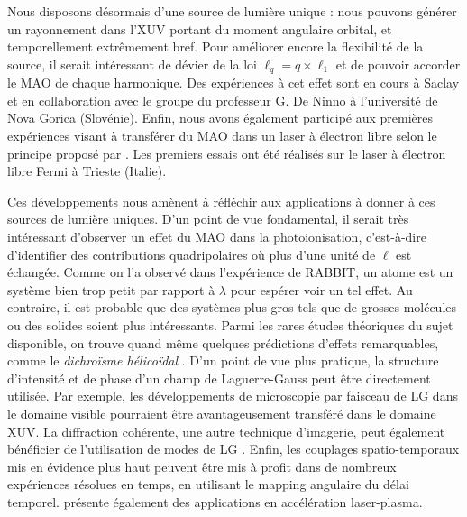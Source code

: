 Nous disposons désormais d'une source de lumière unique : nous pouvons générer un rayonnement dans l'XUV portant du moment angulaire orbital, et temporellement extrêmement bref. Pour améliorer encore la flexibilité de la source, il serait intéressant de dévier de la loi $\ell_q=q\times\ell_1$ et de pouvoir accorder le MAO de chaque harmonique. Des expériences à cet effet sont en cours à Saclay et en collaboration avec le groupe du professeur G. De Ninno à l'université de Nova Gorica (Slovénie). Enfin, nous avons également participé aux premières expériences visant à transférer du MAO dans un laser à électron libre selon le principe proposé par . Les premiers essais ont été réalisés sur le laser à électron libre Fermi à Trieste (Italie). 

Ces développements nous amènent à réfléchir aux applications à donner à ces sources de lumière uniques. D'un point de vue fondamental, il serait très intéressant d'observer un effet du MAO dans la photoionisation, c'est-à-dire d'identifier des contributions quadripolaires où plus d'une unité de $\ell$ est échangée. Comme on l'a observé dans l'expérience de RABBIT, un atome est un système bien trop petit par rapport à $\lambda$ pour espérer voir un tel effet. Au contraire, il est probable que des systèmes plus gros tels que de grosses molécules ou des solides soient plus intéressants. Parmi les rares études théoriques du sujet disponible, on trouve quand même quelques prédictions d'effets remarquables, comme le \textit{dichroïsme hélicoïdal} .
D'un point de vue plus pratique, la structure d'intensité et de phase d'un champ de Laguerre-Gauss peut être directement utilisée. Par exemple, les développements de microscopie par faisceau de LG dans le domaine visible  pourraient être avantageusement transféré dans le domaine XUV. La diffraction cohérente, une autre technique d'imagerie, peut également bénéficier de l'utilisation de modes de LG . Enfin, les couplages spatio-temporaux mis en évidence plus haut peuvent être mis à profit dans de nombreux expériences résolues en temps, en utilisant le mapping angulaire du délai temporel.  présente également des applications en accélération laser-plasma.